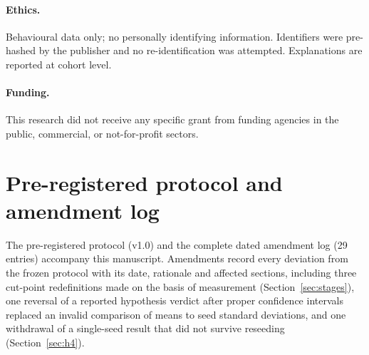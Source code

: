\documentclass[review,3p,times,authoryear]{elsarticle}   %
\begin{document}
\paragraph{Ethics.} Behavioural data only; no personally identifying information. Identifiers were pre-hashed by the publisher and no re-identification was attempted. Explanations are reported at cohort level.

\paragraph{Funding.} This research did not receive any specific grant from funding agencies in the public, commercial, or not-for-profit sectors.

\appendix
\section{Pre-registered protocol and amendment log}

The pre-registered protocol (v1.0) and the complete dated amendment log (29
entries) accompany this manuscript. Amendments record every deviation from the
frozen protocol with its date, rationale and affected sections, including three
cut-point redefinitions made on the basis of measurement
(Section~\ref{sec:stages}), one reversal of a reported hypothesis verdict after
proper confidence intervals replaced an invalid comparison of means to seed
standard deviations, and one withdrawal of a single-seed result that did not
survive reseeding (Section~\ref{sec:h4}).



\end{document}

